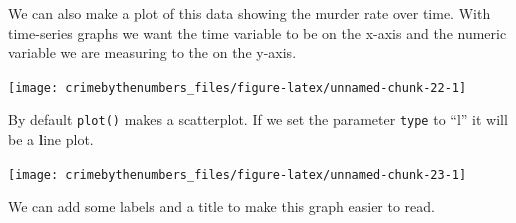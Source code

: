 \documentclass[
  12pt,
]{book}
\newenvironment{Shaded}{\begin{snugshade}}{\end{snugshade}}
\newcommand{\DataTypeTok}[1]{\textcolor[rgb]{0.27,0.27,0.27}{#1}}
\newcommand{\KeywordTok}[1]{\textcolor[rgb]{0.27,0.27,0.27}{\textbf{#1}}}
\newcommand{\NormalTok}[1]{#1}
\newcommand{\OperatorTok}[1]{\textcolor[rgb]{0.43,0.43,0.43}{\textbf{#1}}}
\newcommand{\StringTok}[1]{\textcolor[rgb]{0.5,0.5,0.5}{#1}}
\begin{document}
We can also make a plot of this data showing the murder rate over time. With time-series graphs we want the time variable to be on the x-axis and the numeric variable we are measuring to the on the y-axis.

\begin{Shaded}
\end{Shaded}

\begin{center}\texttt{[image: crimebythenumbers\_files/figure-latex/unnamed-chunk-22-1]} \end{center}

By default \texttt{plot()} makes a scatterplot. If we set the parameter \texttt{type} to ``l'' it will be a \textbf{l}ine plot.

\begin{Shaded}
\end{Shaded}

\begin{center}\texttt{[image: crimebythenumbers\_files/figure-latex/unnamed-chunk-23-1]} \end{center}

We can add some labels and a title to make this graph easier to read.

\begin{Shaded}
\end{Shaded}
\end{document}
